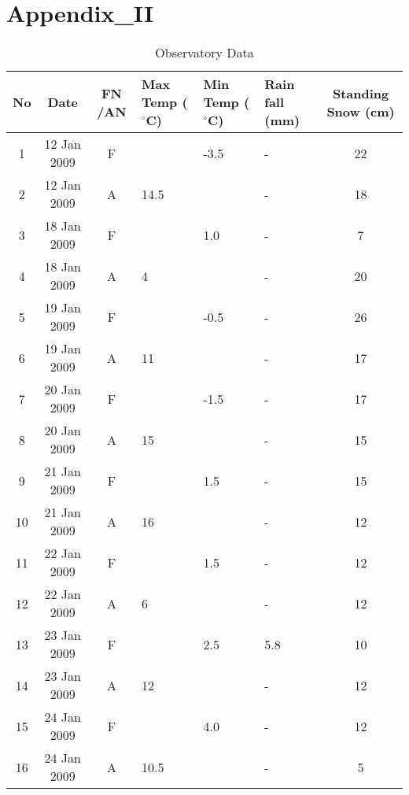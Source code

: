 \chapter{Appendix_II}
\begin{table}[t]
	\caption [Observatory data during dual-pol SAR data acquisitions]{Observatory Data}
	\begin{center}
		\begin{tabular}{| c | c | c | p{1.5cm} | p{1.5cm} | p{1.5cm} | c |} \hline
			No & Date  & FN /AN  & Max Temp ($^\circ$C)  & Min Temp ($^\circ$C)  & Rain fall (mm)  & Standing Snow (cm)\\ \hline \hline
			1 & 12 Jan 2009 & F  &      & -3.5 &-  & 22\\ \hline
			2 & 12 Jan 2009 & A  & 14.5 &      &-  & 18\\ \hline 
			3 & 18 Jan 2009 & F  &      & 1.0  &-  & 7\\ \hline
			4 & 18 Jan 2009 & A  &  4   &      &-  & 20\\ \hline 
			5 & 19 Jan 2009 & F  &      & -0.5 &-  & 26\\ \hline
			6 & 19 Jan 2009 & A  &  11  &      &-  & 17\\ \hline 
			7 & 20 Jan 2009 & F  &      & -1.5 &-  & 17\\ \hline
			8 & 20 Jan 2009 & A  &  15  &      &-  & 15\\ \hline 
			9 & 21 Jan 2009 & F  &      & 1.5  &-  & 15\\ \hline
			10 & 21 Jan 2009 & A &  16  &      &-  & 12\\ \hline 
			11 & 22 Jan 2009 & F &      & 1.5  &-  & 12\\ \hline
			12 & 22 Jan 2009 & A &  6   &      &-  & 12\\ \hline 
			13 & 23 Jan 2009 & F &      & 2.5  & 5.8 & 10\\ \hline
			14 & 23 Jan 2009 & A &  12  &      &-  & 12\\ \hline 
			15 & 24 Jan 2009 & F &      & 4.0  &-  & 12\\ \hline
			16 & 24 Jan 2009 & A &  10.5&      &- & 5\\ \hline 
		\end{tabular}
	\end{center}
	\label{table:Snowfork_data}
\end{table}